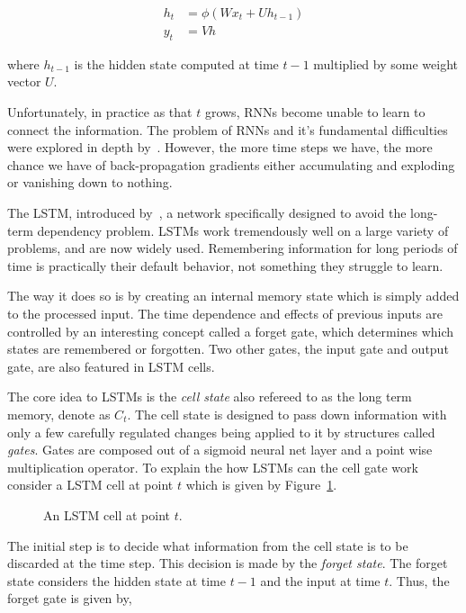 \begin{align}\label{eq:recurrent_neural_network_equations}
    h_t & = \phi(Wx_t + Uh_{t-1}) \\
    y_t & = Vh
\end{align}

where \(h_{t-1}\) is the hidden state computed at time \(t-1\) multiplied by
some weight vector \(U\).

Unfortunately, in practice as that \(t\) grows, RNNs become unable to learn to
connect the information. The problem of RNNs and it's fundamental difficulties
were explored in depth by~\cite{Bengio1994}. However, the more time steps we
have, the more chance we have of back-propagation gradients either accumulating
and exploding or vanishing down to nothing.

The LSTM, introduced by~\cite{Hochreiter1997}, a network specifically designed
to avoid the long-term dependency problem. LSTMs work tremendously well on a
large variety of problems, and are now widely used. Remembering information for
long periods of time is practically their default behavior, not something they
struggle to learn.

The way it does so is by creating an internal memory state which is simply added
to the processed input. The time dependence and effects of previous inputs are
controlled by an interesting concept called a forget gate, which determines
which states are remembered or forgotten. Two other gates, the input gate and
output gate, are also featured in LSTM cells.

The core idea to LSTMs is the \textit{cell state} also refereed to as the
long term memory, denote as \(C_t\). The cell state is designed to pass down
information with only a few carefully regulated changes being applied to it
by structures called \textit{gates}. Gates are composed out of a sigmoid neural
net layer and a point wise multiplication operator. To explain the how LSTMs
can the cell gate work consider a LSTM cell at point \(t\) which is given by
Figure~\ref{fig:lstm_cell}.

\begin{figure}[!htbp]
    \centering
    
    \caption{An LSTM cell at point \(t\).}\label{fig:lstm_cell}
\end{figure}

The initial step is to decide what information from the cell state is to be
discarded at the time step. This decision is made by the \textit{forget state}.
The forget state considers the hidden state at time \(t-1\) and the input at time
\(t\). Thus, the forget gate is given by,

